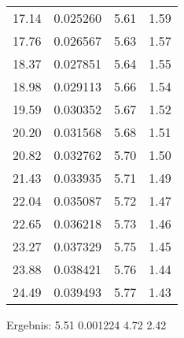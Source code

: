 \begin{center}
\begin{tabular}{c | c c c}
        17.14 &  0.025260 &  5.61 &  1.59 \\
        17.76 &  0.026567 &  5.63 &  1.57 \\
        18.37 &  0.027851 &  5.64 &  1.55 \\
        18.98 &  0.029113 &  5.66 &  1.54 \\
        19.59 &  0.030352 &  5.67 &  1.52 \\
        20.20 &  0.031568 &  5.68 &  1.51 \\
        20.82 &  0.032762 &  5.70 &  1.50 \\
        21.43 &  0.033935 &  5.71 &  1.49 \\
        22.04 &  0.035087 &  5.72 &  1.47 \\
        22.65 &  0.036218 &  5.73 &  1.46 \\
        23.27 &  0.037329 &  5.75 &  1.45 \\
        23.88 &  0.038421 &  5.76 &  1.44 \\
        24.49 &  0.039493 &  5.77 &  1.43 \\
    \end{tabular}
\end{center}

Ergebnis:  5.51  0.001224  4.72  2.42 \\